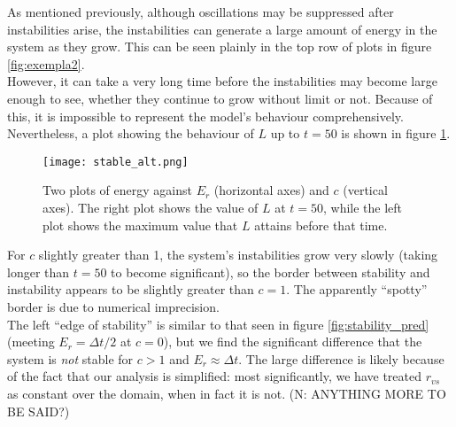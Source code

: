 \documentclass[11pt]{article}
\begin{document}
As mentioned previously, although oscillations may be suppressed after instabilities arise, the instabilities can generate a large amount of energy in the system as they grow. This can be seen plainly in the top row of plots in figure \ref{fig:exempla2}. \\
However, it can take a very long time before the instabilities may become large enough to see, whether they continue to grow without limit or not. Because of this, it is impossible to represent the model's behaviour comprehensively. Nevertheless, a plot showing the behaviour of $L$ up to $t=50$ is shown in figure \ref{fig:stable_alt}.
\begin{figure}[H]
\centering
\texttt{[image: stable\_alt.png]}
\caption{Two plots of energy against $E_r$ (horizontal axes) and $c$ (vertical axes). The right plot shows the value of $L$ at $t=50$, while the left plot shows the maximum value that $L$ attains before that time.}
\label{fig:stable_alt}
\end{figure}
For $c$ slightly greater than 1, the system's instabilities grow very slowly (taking longer than $t=50$ to become significant), so the border between stability and instability appears to be slightly greater than $c=1$. The apparently ``spotty'' border is due to numerical imprecision. \\
The left ``edge of stability'' is similar to that seen in figure \ref{fig:stability_pred} (meeting $E_r=\Delta t/2$ at $c=0$), but we find the significant difference that the system is \emph{not} stable for $c>1$ and $E_r\approx\Delta t$. The large difference is likely because of the fact that our analysis is simplified: most significantly, we have treated $r_{vs}$ as constant over the domain, when in fact it is not. (N: ANYTHING MORE TO BE SAID?)

\end{document}
